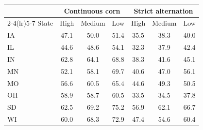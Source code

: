 \begin{tabular}{lcccccc}
\toprule
& \multicolumn{3}{c}{Continuous corn} & \multicolumn{3}{c}{Strict alternation}\\
\cmidrule(lr){2-4}\cmidrule(lr){5-7}
State & High & Medium & Low & High & Medium & Low\\
\midrule
IA & 47.1 & 50.0 & 51.4 & 35.5 & 38.3 & 40.0 \\
IL & 44.6 & 48.6 & 54.1 & 32.3 & 37.9 & 42.4 \\
IN & 62.8 & 64.1 & 68.8 & 38.3 & 41.6 & 45.1 \\
MN & 52.1 & 58.1 & 69.7 & 40.6 & 47.0 & 56.1 \\
MO & 56.6 & 60.5 & 65.4 & 44.6 & 49.3 & 50.5 \\
OH & 58.9 & 58.7 & 60.5 & 33.5 & 34.5 & 37.8 \\
SD & 62.5 & 69.2 & 75.2 & 56.9 & 62.1 & 66.7 \\
WI & 60.0 & 68.3 & 72.9 & 47.4 & 54.6 & 60.4 \\
\bottomrule
\end{tabular}
